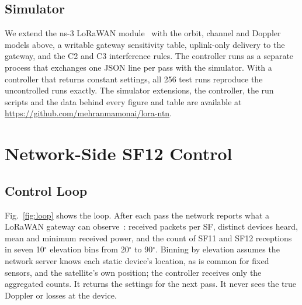 \documentclass[journal]{IEEEtran}
\begin{document}
\subsection{Simulator}
We extend the ns-3 LoRaWAN module~\cite{ns3lorawan} with the orbit, channel and Doppler models above, a writable gateway sensitivity table, uplink-only delivery to the gateway, and the C2 and C3 interference rules. The controller runs as a separate process that exchanges one JSON line per pass with the simulator. With a controller that returns constant settings, all 256 test runs reproduce the uncontrolled runs exactly. The simulator extensions, the controller, the run scripts and the data behind every figure and table are available at \url{https://github.com/mehranmamonai/lora-ntn}.

\section{Network-Side SF12 Control}\label{sec:controller}

\subsection{Control Loop}
Fig.~\ref{fig:loop} shows the loop. After each pass the network reports what a LoRaWAN gateway can observe~\cite{sx1301}: received packets per SF, distinct devices heard, mean and minimum received power, and the count of SF11 and SF12 receptions in seven 10$^\circ$ elevation bins from 20$^\circ$ to 90$^\circ$. Binning by elevation assumes the network server knows each static device's location, as is common for fixed sensors, and the satellite's own position; the controller receives only the aggregated counts. It returns the settings for the next pass. It never sees the true Doppler or losses at the device.
\end{document}
